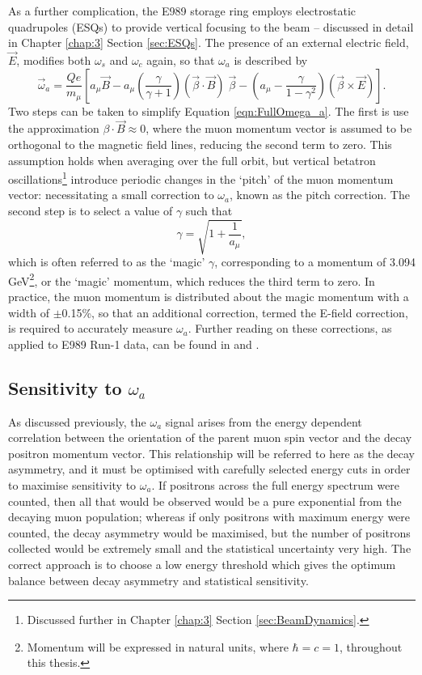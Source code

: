 As a further complication, the E989 storage ring employs electrostatic quadrupoles (ESQs) to provide vertical focusing to the beam -- discussed in detail in Chapter \ref{chap:3} Section \ref{sec:ESQs}. The presence of an external electric field, $\vec{E}$, modifies both $\omega_{s}$ and $\omega_{c}$ again, so that $\omega_{a}$ is described by
%
\begin{equation}
  \vec{\omega}_{a}=\frac{Qe}{m_{\mu}} \left[ a_{\mu}\vec{B}-a_{\mu}\left(\frac{\gamma}{\gamma+1}\right)(\vec{\beta}\cdot\vec{B})\;\vec{\beta}-\left(a_{\mu}-\frac{\gamma}{1-\gamma^{2}}\right) (\vec{\beta} \times \vec{E}) \right]. %
  \label{eqn:FullOmega_a}
\end{equation}
%
Two steps can be taken to simplify Equation \ref{eqn:FullOmega_a}. The first is use the approximation $\beta\cdot\vec{B}\approx0$, where the muon momentum vector is assumed to be orthogonal to the magnetic field lines, reducing the second term to zero. This assumption holds when averaging over the full orbit, but vertical betatron oscillations\footnote{Discussed further in Chapter \ref{chap:3} Section \ref{sec:BeamDynamics}.} introduce periodic changes in the `pitch' of the muon momentum vector: necessitating a small correction to $\omega_{a}$, known as the pitch correction. The second step is to select a value of $\gamma$ such that
%
\begin{equation}
  \gamma=\sqrt{1+\frac{1}{a_{\mu}}},
  \label{eqn:MagicGamma}
\end{equation}
%
which is often referred to as the `magic' $\gamma$, corresponding to a momentum of 3.094 GeV\footnote{Momentum will be expressed in natural units, where $\hbar=c=1$, throughout this thesis.}, or the `magic' momentum, which reduces the third term to zero. In practice, the muon momentum is distributed about the magic momentum with a width of $\pm$0.15\%, so that an additional correction, termed the E-field correction, is required to accurately measure $\omega_{a}$. Further reading on these corrections, as applied to E989 Run-1 data, can be found in \cite{OmegaARun1} and \cite{BeamDynamics}.

\subsection{Sensitivity to $\omega_{a}$}\label{subsec:SensitivityToOmegaA}
% 
As discussed previously, the $\omega_{a}$ signal arises from the energy dependent correlation between the orientation of the parent muon spin vector and the decay positron momentum vector. This relationship will be referred to here as the decay asymmetry, and it must be optimised with carefully selected energy cuts in order to maximise sensitivity to $\omega_{a}$. If positrons across the full energy spectrum were counted, then all that would be observed would be a pure exponential from the decaying muon population; whereas if only positrons with maximum energy were counted, the decay asymmetry would be maximised, but the number of positrons collected would be extremely small and the statistical uncertainty very high. The correct approach is to choose a low energy threshold which gives the optimum balance between decay asymmetry and statistical sensitivity. 

